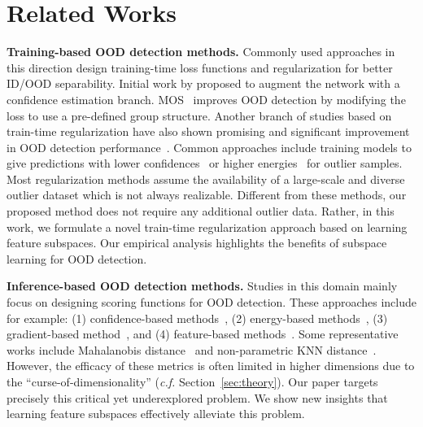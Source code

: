 
\section{Related Works}
\label{sec:related works}

\vspace{0.1cm}
\noindent\textbf{Training-based OOD detection methods.} Commonly used approaches in this direction design training-time loss functions and regularization for better ID/OOD separability. Initial work by \cite{devries2017improved} proposed to augment the network with a confidence estimation branch. MOS~\cite{huang2021mos} improves OOD detection by modifying the loss to use a pre-defined group structure. Another branch of studies based on train-time regularization have also shown promising and significant improvement in OOD detection performance~\cite{lee2017training, bevandic2018discriminative, hendrycks2018deep, geifman2019selective, hein2019why, meinke2019towards, liu2020energy, wei2022mitigating,  KatzSamuels2022, Du2022, Du2022a, ming2022posterior, hebbalaguppenovel, ming2023how, huang2023harnessing, wang2023outofdistribution, bai2023feed, wang2023learning, du2023dream, zheng2023detection}. Common approaches include training models to give predictions with lower confidences~\cite{lee2018simple, hendrycks2018deep, wang2022outofdistribution} or higher energies~\cite{liu2020energy, Du2022, song2022rankfeat} for outlier samples. 
    Most regularization methods assume the availability of a large-scale and diverse outlier dataset which is not always realizable. 
    Different from these methods, our proposed method does not require any additional outlier data. Rather, in this work, we formulate a novel train-time regularization approach based on learning feature subspaces. Our empirical analysis highlights the benefits of subspace learning for OOD detection.

\vspace{0.1cm}
 \noindent\textbf{Inference-based OOD detection methods.} Studies in this domain mainly focus on designing scoring functions for OOD detection. These approaches include for example: (1) confidence-based methods~\cite{hendrycks2016baseline, liang2018enhancing}, (2) energy-based methods~\cite{liu2020energy, morteza2022provable}, (3) gradient-based method~\cite{huang2021importance}, and (4) {feature-based methods}~\cite{Wilson_2023_ICCV}. Some representative works include Mahalanobis distance~\cite{lee2018simple, 2021ssd} and non-parametric KNN distance~\cite{sun2022knn}. However, the efficacy of these metrics is often limited in higher dimensions due to the ``curse-of-dimensionality'' (\textit{c.f.} Section~\ref{sec:theory}). Our paper targets precisely this critical yet underexplored problem. 
    We show new insights that learning feature subspaces effectively alleviate this problem. 

